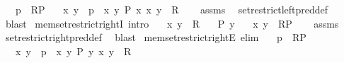 \begin{isabellebody}
\ \ \ {\isachardoublequoteopen}p\ {\isasymin}\ R{\isasymrestriction}\isactrlbsub P\isactrlesub {\isachardoublequoteclose}\isanewline
\ \ \ x\ y\ \ {\isachardoublequoteopen}p\ {\isacharequal}{\kern0pt}\ {\isasymlangle}x{\isacharcomma}{\kern0pt}\ y{\isasymrangle}{\isachardoublequoteclose}\ {\isachardoublequoteopen}P\ x{\isachardoublequoteclose}\ {\isachardoublequoteopen}{\isasymlangle}x{\isacharcomma}{\kern0pt}\ y{\isasymrangle}\ {\isasymin}\ R{\isachardoublequoteclose}\isanewline
%
\isadelimproof
\ \ %
\endisadelimproof
%
\isatagproof
{}\isamarkupfalse%
\ assms\ \isamarkupfalse%
\ set{\isacharunderscore}{\kern0pt}restrict{\isacharunderscore}{\kern0pt}left{\isacharunderscore}{\kern0pt}pred{\isacharunderscore}{\kern0pt}def\ \isamarkupfalse%
\ blast%
\endisatagproof
{\isafoldproof}%
%
\isadelimproof
\isanewline
%
\endisadelimproof
\isanewline
{}\isamarkupfalse%
\ mem{\isacharunderscore}{\kern0pt}set{\isacharunderscore}{\kern0pt}restrict{\isacharunderscore}{\kern0pt}rightI\ {\isacharbrackleft}{\kern0pt}intro{\isacharbang}{\kern0pt}{\isacharbrackright}{\kern0pt}{\isacharcolon}{\kern0pt}\isanewline
\ \ \ {\isachardoublequoteopen}{\isasymlangle}x{\isacharcomma}{\kern0pt}\ y{\isasymrangle}\ {\isasymin}\ R{\isachardoublequoteclose}\isanewline
\ \ \ {\isachardoublequoteopen}P\ y{\isachardoublequoteclose}\isanewline
\ \ \ {\isachardoublequoteopen}{\isasymlangle}x{\isacharcomma}{\kern0pt}\ y{\isasymrangle}\ {\isasymin}\ R{\isasymupharpoonleft}\isactrlbsub P\isactrlesub {\isachardoublequoteclose}\isanewline
%
\isadelimproof
\ \ %
\endisadelimproof
%
\isatagproof
{}\isamarkupfalse%
\ assms\ \isamarkupfalse%
\ set{\isacharunderscore}{\kern0pt}restrict{\isacharunderscore}{\kern0pt}right{\isacharunderscore}{\kern0pt}pred{\isacharunderscore}{\kern0pt}def\ \isamarkupfalse%
\ blast%
\endisatagproof
{\isafoldproof}%
%
\isadelimproof
\isanewline
%
\endisadelimproof
\isanewline
{}\isamarkupfalse%
\ mem{\isacharunderscore}{\kern0pt}set{\isacharunderscore}{\kern0pt}restrict{\isacharunderscore}{\kern0pt}rightE\ {\isacharbrackleft}{\kern0pt}elim{\isacharbrackright}{\kern0pt}{\isacharcolon}{\kern0pt}\isanewline
\ \ \ {\isachardoublequoteopen}p\ {\isasymin}\ R{\isasymupharpoonleft}\isactrlbsub P\isactrlesub {\isachardoublequoteclose}\isanewline
\ \ \ x\ y\ \ {\isachardoublequoteopen}p\ {\isacharequal}{\kern0pt}\ {\isasymlangle}x{\isacharcomma}{\kern0pt}\ y{\isasymrangle}{\isachardoublequoteclose}\ {\isachardoublequoteopen}P\ y{\isachardoublequoteclose}\ {\isachardoublequoteopen}{\isasymlangle}x{\isacharcomma}{\kern0pt}\ y{\isasymrangle}\ {\isasymin}\ R{\isachardoublequoteclose}\isanewline

\end{isabellebody}
